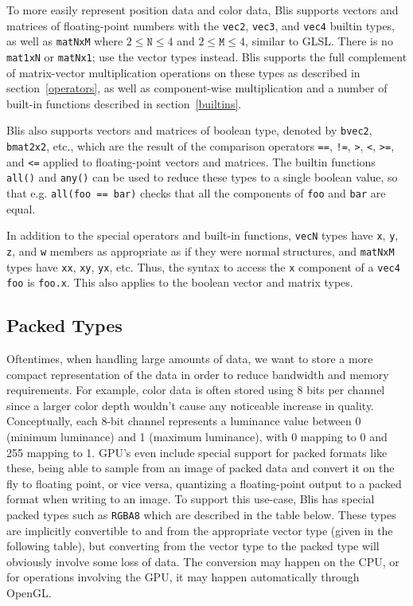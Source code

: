 \documentclass[11pt]{article}
\newcommand{\code}[1]{\texttt{#1}}
\begin{document}
To more easily represent position data and color data, Blis supports vectors and matrices of floating-point numbers with the \code{vec2}, \code{vec3}, and \code{vec4} builtin types, as well as \code{matNxM} where  $2 \leq \code{N} \leq 4$ and $2 \leq \code{M} \leq 4$, similar to GLSL. There is no \code{mat1xN} or \code{matNx1}; use the vector types instead. Blis supports the full complement of matrix-vector multiplication operations on these types as described in section~\ref{operators}, as well as component-wise multiplication and a number of built-in functions described in section~\ref{builtins}.

Blis also supports vectors and matrices of boolean type, denoted by \code{bvec2}, \code{bmat2x2}, etc., which are the result of the comparison operators \code{==}, \code{!=}, \code{>}, \code{<}, \code{>=}, and \code{<=} applied to floating-point vectors and matrices. The builtin functions \code{all()} and \code{any()} can be used to reduce these types to a single boolean value, so that e.g. \code{all(foo == bar)} checks that all the components of \code{foo} and \code{bar} are equal.

In addition to the special operators and built-in functions, \code{vecN} types have \code{x}, \code{y}, \code{z}, and \code{w} members as appropriate as if they were normal structures, and \code{matNxM} types have \code{xx}, \code{xy}, \code{yx}, etc. Thus, the syntax to access the \code{x} component of a \code{vec4 foo} is \code{foo.x}. This also applies to the boolean vector and matrix types.

\subsection{Packed Types}

Oftentimes, when handling large amounts of data, we want to store a more compact representation of the data in order to reduce bandwidth and memory requirements. For example, color data is often stored using 8 bits per channel since a larger color depth wouldn't cause any noticeable increase in quality. Conceptually, each 8-bit channel represents a luminance value between 0 (minimum luminance) and 1 (maximum luminance), with 0 mapping to 0 and 255 mapping to 1. GPU's even include special support for packed formats like these, being able to sample from an image of packed data and convert it on the fly to floating point, or vice versa, quantizing a floating-point output to a packed format when writing to an image. To support this use-case, Blis has special packed types such as \code{RGBA8} which are described in the table below. These types are implicitly convertible to and from the appropriate vector type (given in the following table), but converting from the vector type to the packed type will obviously involve some loss of data. The conversion may happen on the CPU, or for operations involving the GPU, it may happen automatically through OpenGL.
\end{document}
